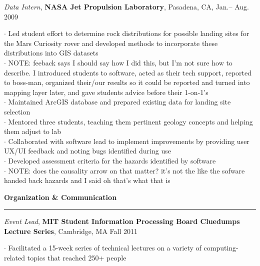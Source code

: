 \documentclass[11pt]{article}
\begin{document}
\smallskip
\emph{Data Intern}, \textbf{NASA Jet Propulsion Laboratory}, Pasadena, CA, Jan.-- Aug. 2009 \\
\begin{small}$\cdot$ {Led student effort to determine rock distributions for possible landing sites for the Mars Curiosity rover and developed methods to incorporate \hspace*{1 mm}these distributions into GIS datasets }\\
$\cdot$ {NOTE: feeback says I should say how I did this, but I'm not sure how to describe. I introduced students to software, acted as their tech support, reported to boss-man, organized their/our results so it could be reported and turned into mapping layer later, and gave students advice before their 1-on-1's}\\ 
$\cdot$ {Maintained ArcGIS  database and prepared existing data for landing site selection } \\
$\cdot$ {Mentored three students, teaching them pertinent geology concepts and helping them adjust to lab }\\
$\cdot$ {Collaborated with software lead to implement improvements by providing user UX/UI feedback and noting bugs identified during use}\\ 
$\cdot$ {Developed assessment criteria for the hazards identified by software}\\
$\cdot$ {NOTE: does the causality arrow on that matter? it's not the like the sofware handed back hazards and I said oh that's what that is}\end{small}

\begin{comment}
\smallskip
\textbf{Research Student}, \emph{Colgate University Geology Laboratories}, Hamilton, NY, Feb.--May 2008 \\
\begin{small}$\cdot$ {Used remote sensing software to create a data system from the digital data of existing satellite images, weather, and climate data }\end{small}
\smallskip
\end{comment}

\vspace*{0.25 mm}
\textbf{Organization \& Communication}
\smallskip
\hrule
\emph{Event Lead}, \textbf{MIT Student Information Processing Board Cluedumps Lecture Series}, Cambridge, MA Fall 2011\\
\begin{small}$\cdot$ {Facilitated a 15-week series of technical lectures on a variety of computing-related topics that reached 250+ people}\end{small}
\end{document}
